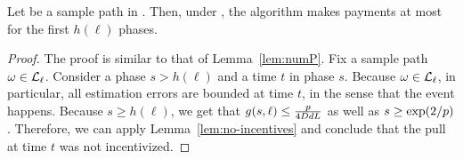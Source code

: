 \begin{lemma} \label{lem:envelope-payments}
Let \SP be a sample path in \Env{\ell}.
Then, under \SP, the algorithm makes payments at most for the first 
$h(\ell)$ phases. 
\end{lemma}

\begin{proof}
The proof is similar to that of Lemma~\ref{lem:numP}.
Fix a sample path $\omega \in {\mathcal L}_{\ell}$.
Consider a phase $s > h(\ell)$ and a time $t$ in phase $s$.
Because $\omega \in {\mathcal L}_{\ell}$, in particular, all estimation errors are
bounded at time $t$, in the sense that the event 
happens.
Because $s \geq h(\ell)$, we get that
$g(s,\ell) \leq \frac{p}{4 D d L}$
as well as $s \geq \exp(2/p)$.
Therefore, we can apply Lemma~\ref{lem:no-incentives} and conclude
that the pull at time $t$ was not incentivized.
\end{proof}

